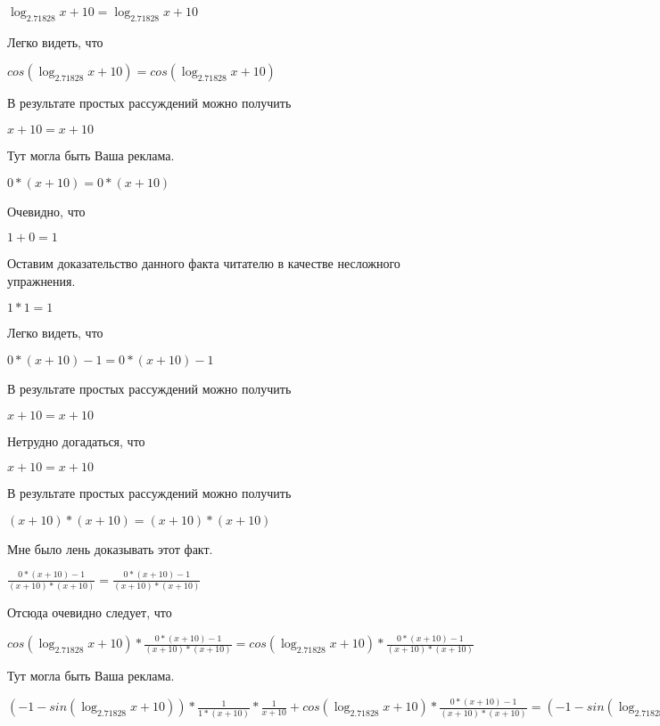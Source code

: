 \documentclass[12pt,a4paper,fleqn]{article}
\theoremstyle{definition}
\begin{document}
$\log_{ 2.71828 }{ x  +  10 } = \log_{ 2.71828 }{ x  +  10 }$

Легко видеть, что 

$cos(\log_{ 2.71828 }{ x  +  10 }) = cos(\log_{ 2.71828 }{ x  +  10 })$

В результате простых рассуждений можно получить 

$ x  +  10  =  x  +  10 $

Тут могла быть Ваша реклама. 

$ 0  * ( x  +  10 ) =  0  * ( x  +  10 )$

Очевидно, что 

$ 1  +  0  =  1 $

Оставим доказательство данного факта читателю в качестве несложного упражнения. 

$ 1  *  1  =  1 $

Легко видеть, что 

$ 0  * ( x  +  10 ) -  1  =  0  * ( x  +  10 ) -  1 $

В результате простых рассуждений можно получить 

$ x  +  10  =  x  +  10 $

Нетрудно догадаться, что 

$ x  +  10  =  x  +  10 $

В результате простых рассуждений можно получить 

$( x  +  10 ) * ( x  +  10 ) = ( x  +  10 ) * ( x  +  10 )$

Мне было лень доказывать этот факт.

$\frac{ 0  * ( x  +  10 ) -  1 }{( x  +  10 ) * ( x  +  10 )}
 = \frac{ 0  * ( x  +  10 ) -  1 }{( x  +  10 ) * ( x  +  10 )}
$

Отсюда очевидно следует, что 

$cos(\log_{ 2.71828 }{ x  +  10 }) * \frac{ 0  * ( x  +  10 ) -  1 }{( x  +  10 ) * ( x  +  10 )}
 = cos(\log_{ 2.71828 }{ x  +  10 }) * \frac{ 0  * ( x  +  10 ) -  1 }{( x  +  10 ) * ( x  +  10 )}
$

Тут могла быть Ваша реклама. 

$( -1  - sin(\log_{ 2.71828 }{ x  +  10 })) * \frac{ 1 }{ 1  * ( x  +  10 )}
 * \frac{ 1 }{ x  +  10 }
 + cos(\log_{ 2.71828 }{ x  +  10 }) * \frac{ 0  * ( x  +  10 ) -  1 }{( x  +  10 ) * ( x  +  10 )}
 = ( -1  - sin(\log_{ 2.71828 }{ x  +  10 })) * \frac{ 1 }{ 1  * ( x  +  10 )}
 * \frac{ 1 }{ x  +  10 }
 + cos(\log_{ 2.71828 }{ x  +  10 }) * \frac{ 0  * ( x  +  10 ) -  1 }{( x  +  10 ) * ( x  +  10 )}
$
\end{document}
